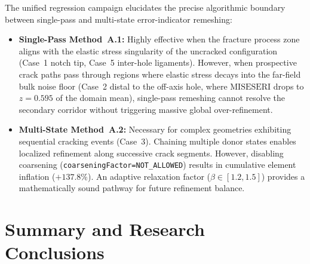 The unified regression campaign elucidates the precise algorithmic boundary between single-pass and multi-state error-indicator remeshing:
\begin{itemize}
  \item \textbf{Single-Pass Method~A.1:} Highly effective when the fracture process zone aligns with the elastic stress singularity of the uncracked configuration (Case~1 notch tip, Case~5 inter-hole ligaments). However, when prospective crack paths pass through regions where elastic stress decays into the far-field bulk noise floor (Case~2 distal to the off-axis hole, where $\text{MISESERI}$ drops to $z = 0.595$ of the domain mean), single-pass remeshing cannot resolve the secondary corridor without triggering massive global over-refinement.
  \item \textbf{Multi-State Method~A.2:} Necessary for complex geometries exhibiting sequential cracking events (Case~3). Chaining multiple donor states enables localized refinement along successive crack segments. However, disabling coarsening (\texttt{coarseningFactor=NOT\_ALLOWED}) results in cumulative element inflation ($+137.8\%$). An adaptive relaxation factor ($\beta \in [1.2, 1.5]$) provides a mathematically sound pathway for future refinement balance.
\end{itemize}

\section{Summary and Research Conclusions}
\label{sec:hole_summary}

